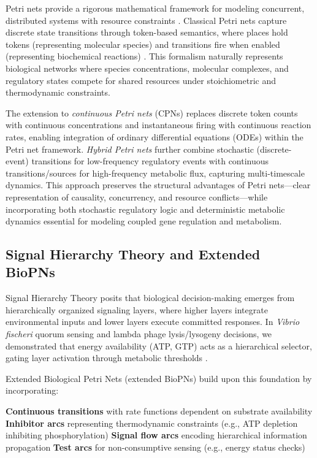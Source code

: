 \documentclass[twocolumn,11pt]{article}
\begin{document}
Petri nets provide a rigorous mathematical framework for modeling concurrent, distributed systems with resource constraints \citep{petri1962}. Classical Petri nets capture discrete state transitions through token-based semantics, where places hold tokens (representing molecular species) and transitions fire when enabled (representing biochemical reactions) \citep{chaouiya2007, heiner2008}. This formalism naturally represents biological networks where species concentrations, molecular complexes, and regulatory states compete for shared resources under stoichiometric and thermodynamic constraints.

The extension to \textit{continuous Petri nets} (CPNs) \citep{david1992, baldazzi2010} replaces discrete token counts with continuous concentrations and instantaneous firing with continuous reaction rates, enabling integration of ordinary differential equations (ODEs) within the Petri net framework. \textit{Hybrid Petri nets} further combine stochastic (discrete-event) transitions for low-frequency regulatory events with continuous transitions/sources for high-frequency metabolic flux, capturing multi-timescale dynamics. This approach preserves the structural advantages of Petri nets—clear representation of causality, concurrency, and resource conflicts—while incorporating both stochastic regulatory logic and deterministic metabolic dynamics essential for modeling coupled gene regulation and metabolism.

\subsection{Signal Hierarchy Theory and Extended BioPNs}

Signal Hierarchy Theory \citep{eugenio2025} posits that biological decision-making emerges from hierarchically organized signaling layers, where higher layers integrate environmental inputs and lower layers execute committed responses. In \textit{Vibrio fischeri} quorum sensing and lambda phage lysis/lysogeny decisions, we demonstrated that energy availability (ATP, GTP) acts as a hierarchical selector, gating layer activation through metabolic thresholds \citep{eugenio2025}.

Extended Biological Petri Nets (extended BioPNs) build upon this foundation by incorporating:

\textbf{Continuous transitions} with rate functions dependent on substrate availability
\textbf{Inhibitor arcs} representing thermodynamic constraints (e.g., ATP depletion inhibiting phosphorylation)
\textbf{Signal flow arcs} encoding hierarchical information propagation
\textbf{Test arcs} for non-consumptive sensing (e.g., energy status checks)
\end{document}
